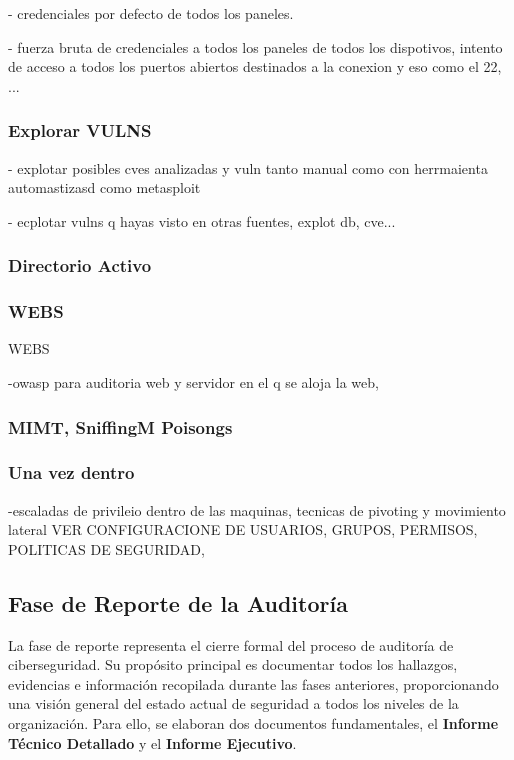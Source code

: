 \documentclass[a4paper, 11pt]{article}
\begin{document}
- credenciales por defecto de todos los paneles.

- fuerza bruta de credenciales a todos los paneles de todos los dispotivos, intento de acceso a todos los puertos abiertos destinados a la conexion y eso como el 22, ...

\subsubsection{Explorar VULNS}

-  explotar posibles cves analizadas y vuln tanto manual como con herrmaienta automastizasd como metasploit

- ecplotar vulns q hayas visto en otras fuentes, explot db, cve...

\subsubsection{Directorio Activo}



\subsubsection{WEBS}

WEBS

-owasp para auditoria web y servidor en el q se aloja la web,

\subsubsection{MIMT, SniffingM Poisongs}


\subsubsection{Una vez dentro}

-escaladas de privileio dentro de las maquinas, tecnicas de pivoting y movimiento lateral
 VER CONFIGURACIONE DE USUARIOS, GRUPOS, PERMISOS, POLITICAS DE SEGURIDAD,



\clearpage




\subsection{Fase de Reporte de la Auditoría}

La fase de reporte representa el cierre formal del proceso de auditoría de ciberseguridad. 
Su propósito principal es documentar todos los hallazgos, evidencias e información recopilada durante las fases anteriores,
 proporcionando una visión general del estado actual de seguridad a todos los niveles de la organización. Para ello,
 se elaboran dos documentos fundamentales, el \textbf{Informe Técnico Detallado} y el \textbf{Informe Ejecutivo}. 
\end{document}
